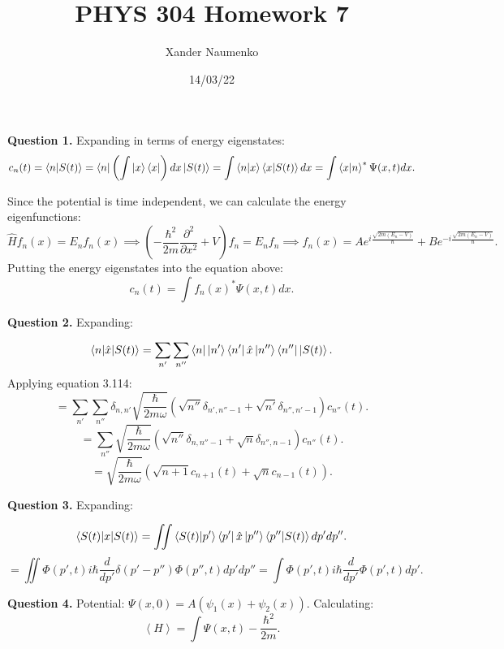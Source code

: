 \documentclass[letterpaper, reqno,11pt]{article}
\begin{document}
\title{PHYS 304 Homework 7}
\date{14/03/22}
\author{Xander Naumenko}
\maketitle

{\noindent\bf Question 1.} Expanding in terms of energy eigenstates: 
\[
c_n(t)=\braket {n|S(t)}=\bra n\left(\int \ket x \bra x\right)dx\ket{S(t)}=\int \braket{n|x}\braket{x|S(t)}dx=\int\braket {x|n}^*\Psi(x, t)dx
.\]

Since the potential is time independent, we can calculate the energy eigenfunctions: 
\[
\hat{H} f_n(x)=E_n f_n(x)\implies \left(-\frac{\hbar^2}{2m}\frac{\partial^2}{\partial x^2}+V\right)  f_n=E_n f_n\implies f_n(x)=Ae^{i\frac{\sqrt{2m(E_n-V)} }{\hbar}}+Be^{-i\frac{\sqrt{2m(E_n-V)} }{\hbar}}
.\]
Putting the energy eigenstates into the equation above: 
\[
c_n(t)=\int f_n(x)^*\Psi(x, t)dx
.\]

{\noindent\bf Question 2.} Expanding: 

\[
\braket{n|\hat{x}|S(t)}=\sum_{n'}\sum_{n''} \bra n \ket {n'}\bra {n'} \hat{x}\ket {n''}\bra {n''}\ket{S(t)} 
.\]
Applying equation 3.114: 
\[
=\sum_{n'}\sum_{n''}\delta_{n, n'}\sqrt{\frac{\hbar}{2m\omega}}\left( \sqrt{n''}\delta_{n', n''-1}+\sqrt{n'} \delta_{n'', n'-1}  \right) c_{n''}(t) 
.\]
\[
=\sum_{n''}\sqrt{\frac{\hbar}{2m\omega}}\left( \sqrt{n''}\delta_{n, n''-1}+\sqrt{n} \delta_{n'', n-1}  \right) c_{n''}(t)
.\]
\[
=\sqrt{\frac{\hbar}{2m\omega}}\left( \sqrt{n+1}c_{n+1}(t)+\sqrt{n} c_{n-1}(t)  \right)
.\]

{\noindent\bf Question 3.} Expanding: 

\[
\braket{S(t)|x|S(t)}=\iint \braket{S(t)|p'}\bra {p'} \hat{x} \ket {p''}\braket{p''|S(t)}dp'dp''
.\]
\[
=\iint \Phi(p', t)i\hbar \frac{d}{dp'}\delta(p'-p'')\Phi(p'', t) dp'dp''=\int\Phi(p', t)i\hbar \frac{d}{dp'}\Phi(p', t)dp'
.\]

{\noindent\bf Question 4.} Potential: $\Psi(x,0)=A\left( \psi_1(x)+\psi_2(x) \right) $. Calculating: 
\[
\left<H \right>=\int \Psi(x, t)-\frac{\hbar^2}{2m}
.\]
\end{document}
